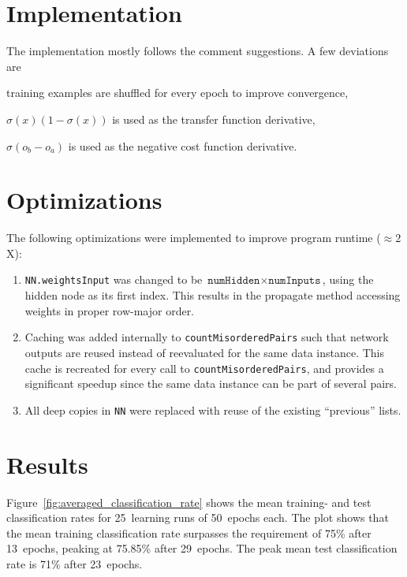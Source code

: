 \setlength\parindent{0pt}

\section*{Implementation}

The implementation mostly follows the comment suggestions. A few deviations are
\begin{enumerate*}[label=\alph*)]
\item training examples are shuffled for every epoch to improve convergence,
\item $\sigma(x)(1 - \sigma(x))$ is used as the transfer function derivative,
\item $\sigma(o_b - o_a)$ is used as the negative cost function derivative.
\end{enumerate*}

\section*{Optimizations}

The following optimizations were implemented to improve program runtime ($\approx 2$X):

\begin{enumerate}
\item \texttt{NN.weightsInput} was changed to be $\texttt{numHidden} \times \texttt{numInputs}$, using the hidden node as its first index. This results in the propagate method accessing weights in proper row-major order.
\item Caching was added internally to \texttt{countMisorderedPairs} such that network outputs are reused instead of reevaluated for the same data instance. This cache is recreated for every call to \texttt{countMisorderedPairs}, and provides a significant speedup since the same data instance can be part of several pairs.
\item All deep copies in \texttt{NN} were replaced with reuse of the existing ``previous'' lists.
\end{enumerate}

\section*{Results}

Figure~\ref{fig:averaged_classification_rate} shows the mean training- and test classification rates for 25~learning runs of 50~epochs each. The plot shows that the mean training classification rate surpasses the requirement of 75\% after 13~epochs, peaking at 75.85\% after 29~epochs. The peak mean test classification rate is 71\% after 23~epochs.

